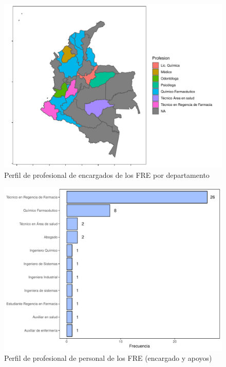 \documentclass[
]{book}
\begin{document}
\begin{figure}
\includegraphics[width=0.85\linewidth]{InformeFinal_files/figure-latex/perfilProfesionalDepartamentos1-1} \caption{Perfil de profesional de encargados de los FRE por departamento}\label{fig:perfilProfesionalDepartamentos1}
\end{figure}

\begin{figure}
\includegraphics[width=0.9\linewidth]{InformeFinal_files/figure-latex/perfilProfesional2-1} \caption{Perfil de profesional de personal de los FRE (encargado y apoyos)}\label{fig:perfilProfesional2}
\end{figure}
\end{document}
